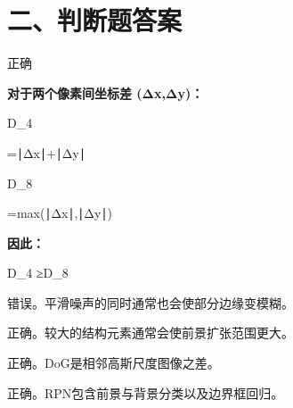 \documentclass[UTF8,openany,oneside,zihao=-4,fontset=windows]{ctexbook}
\begin{document}
\section{二、判断题答案}
\par 正确
\par\noindent\textbf{对于两个像素间坐标差 (Δx,Δy)：}
\begin{center}\small\ttfamily D\_4\end{center}
\par =∣Δx∣+∣Δy∣
\begin{center}\small\ttfamily D\_8\end{center}
\par =max(∣Δx∣,∣Δy∣)
\par\noindent\textbf{因此：}
\begin{center}\small\ttfamily D\_4 ≥D\_8\end{center}
\par 错误。平滑噪声的同时通常也会使部分边缘变模糊。
\par 正确。较大的结构元素通常会使前景扩张范围更大。
\par 正确。DoG是相邻高斯尺度图像之差。
\par 正确。RPN包含前景与背景分类以及边界框回归。
\end{document}
